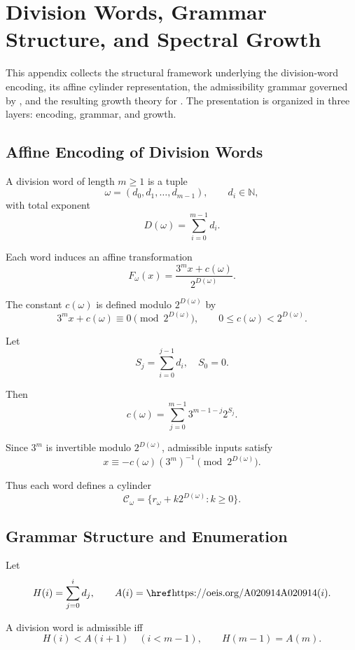 \documentclass[12pt, oneside]{article}
\numberwithin{equation}{section}
\theoremstyle{definition}
\theoremstyle{plain}
\theoremstyle{remark}
\begin{document}
\section{Division Words, Grammar Structure, and Spectral Growth}
\label{app:spine}

This appendix collects the structural framework underlying the division-word encoding,
its affine cylinder representation, the admissibility grammar governed by ,
and the resulting growth theory for . The presentation is organized in three layers:
encoding, grammar, and growth.

\subsection{Affine Encoding of Division Words}
\label{app:spine-affine}

A division word of length $m \ge 1$ is a tuple
\[
\omega = (d_0, d_1, \dots, d_{m-1}), \qquad d_i \in \mathbb{N},
\]
with total exponent
\[
D(\omega) = \sum_{i=0}^{m-1} d_i.
\]

Each word induces an affine transformation
\[
F_\omega(x) = \frac{3^m x + c(\omega)}{2^{D(\omega)}}.
\]

The constant $c(\omega)$ is defined modulo $2^{D(\omega)}$ by
\[
3^m x + c(\omega) \equiv 0 \pmod{2^{D(\omega)}},
\qquad 0 \le c(\omega) < 2^{D(\omega)}.
\]

Let
\[
S_j = \sum_{i=0}^{j-1} d_i, \quad S_0 = 0.
\]

Then
\[
c(\omega)
=
\sum_{j=0}^{m-1}
3^{m-1-j} 2^{S_j}.
\]

Since $3^m$ is invertible modulo $2^{D(\omega)}$, admissible inputs satisfy
\[
x \equiv -c(\omega)(3^m)^{-1} \pmod{2^{D(\omega)}}.
\]

Thus each word defines a cylinder
\[
\mathcal{C}_\omega = \{ r_\omega + k2^{D(\omega)} : k \ge 0 \}.
\]

\subsection{Grammar Structure and Enumeration}
\label{app:spine-grammar}

Let
\[
H(i) = \sum_{j=0}^i d_j,
\qquad A(i) = \text{\OEIS{A020914}}(i).
\]

A division word is admissible iff
\[
H(i) < A(i+1) \quad (i < m-1),
\qquad
H(m-1) = A(m).
\]
\end{document}
